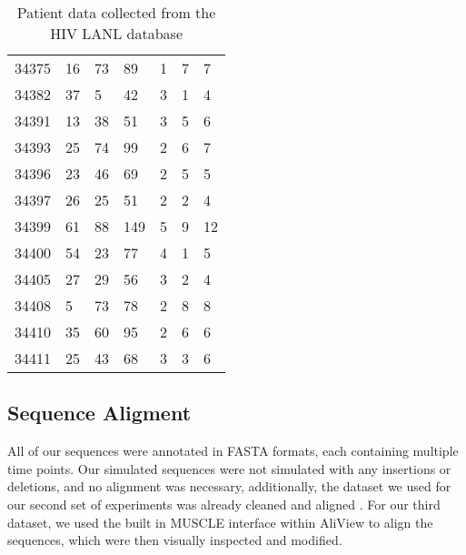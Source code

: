 \begin{table*}[!ht]
\begin{tabularx}{\textwidth}{ X | X | X | X | X | X | X }
34375 &       16 &       73 &       89 &        1 &        7 &        7  \\ 
34382 &       37 &        5 &       42 &        3 &        1 &        4  \\ 
34391 &       13 &       38 &       51 &        3 &        5 &        6  \\ 
34393 &       25 &       74 &       99 &        2 &        6 &        7  \\ 
34396 &       23 &       46 &       69 &        2 &        5 &        5 \\ 
34397 &       26 &       25 &       51 &        2 &        2 &        4  \\ 
34399 &       61 &       88 &      149 &        5 &        9 &       12  \\ 
34400 &       54 &       23 &       77 &        4 &        1 &        5  \\ 
34405 &       27 &       29 &       56 &        3 &        2 &        4  \\ 
34408 &        5 &       73 &       78 &        2 &        8 &        8 \\ 
34410 &       35 &       60 &       95 &        2 &        6 &        6 \\ 
34411 &       25 &       43 &       68 &        3 &        3 &        6   \\ \hline \hline
\end{tabularx}

  \caption{Patient data collected from the HIV LANL database}
\end{table*}

\subsection{Sequence Aligment} \label{subsec:seqalign}
All of our sequences were annotated in FASTA formats, each containing multiple time points. Our simulated sequences were not simulated with any insertions or deletions, and no alignment was necessary, additionally, the dataset we used for our second set of experiments was already cleaned and aligned \citep{McCloskey14}. For our third dataset, we used the built in MUSCLE \citep{Muscle04} interface within AliView \citep{AliView14} to align the sequences, which were then visually inspected and modified. 

